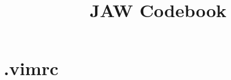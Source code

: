\documentclass{article}
\begin{document}
\title{JAW Codebook}
\author{}
\date{}
\maketitle

\tableofcontents

\section{.vimrc}

\end{document}
